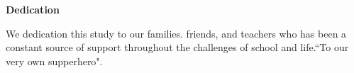 \begin{center}
	\textbf{Dedication}
\end{center}

We dedication this study to our families. friends, and teachers  who has been a constant source of support throughout the challenges of school and life.``To our very own supperhero".